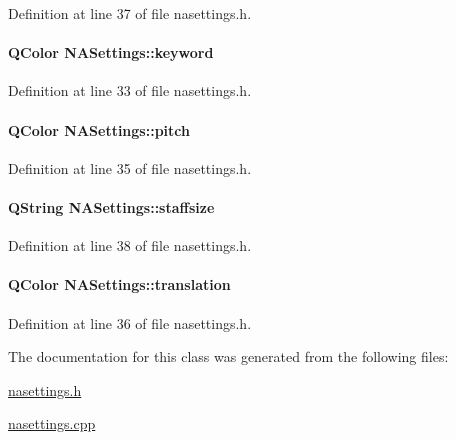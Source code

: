 \-Definition at line 37 of file nasettings.\-h.

\hypertarget{class_n_a_settings_a350ad35ee9f5f7b281dc737c856c60b6}{
\paragraph[{keyword}]{\setlength{\rightskip}{0pt plus 5cm}\-Q\-Color {\bf \-N\-A\-Settings\-::keyword}}}\label{class_n_a_settings_a350ad35ee9f5f7b281dc737c856c60b6}


\-Definition at line 33 of file nasettings.\-h.

\hypertarget{class_n_a_settings_af6987962f1746780b2f33ffb370498c0}{
\paragraph[{pitch}]{\setlength{\rightskip}{0pt plus 5cm}\-Q\-Color {\bf \-N\-A\-Settings\-::pitch}}}\label{class_n_a_settings_af6987962f1746780b2f33ffb370498c0}


\-Definition at line 35 of file nasettings.\-h.

\hypertarget{class_n_a_settings_aa0fd38ef4993f6982c3147642912572a}{
\paragraph[{staffsize}]{\setlength{\rightskip}{0pt plus 5cm}\-Q\-String {\bf \-N\-A\-Settings\-::staffsize}}}\label{class_n_a_settings_aa0fd38ef4993f6982c3147642912572a}


\-Definition at line 38 of file nasettings.\-h.

\hypertarget{class_n_a_settings_a87da2bfd4a25e0eafde61fb41c9a4931}{
\paragraph[{translation}]{\setlength{\rightskip}{0pt plus 5cm}\-Q\-Color {\bf \-N\-A\-Settings\-::translation}}}\label{class_n_a_settings_a87da2bfd4a25e0eafde61fb41c9a4931}


\-Definition at line 36 of file nasettings.\-h.



\-The documentation for this class was generated from the following files\-:\begin{DoxyCompactItemize}
\item 
\hyperlink{nasettings_8h}{nasettings.\-h}\item 
\hyperlink{nasettings_8cpp}{nasettings.\-cpp}\end{DoxyCompactItemize}
